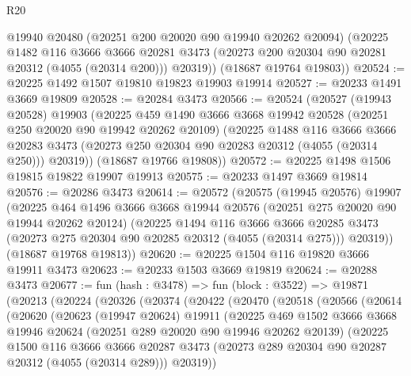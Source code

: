 \begin{lexlean}{R20}
\begin{coremodule}
        @19940
        @20480
        (@20251 @200 @20020 @90 @19940 @20262 @20094)
        (@20225
          @1482
          @116
          @3666
          @3666
          @20281
          @3473
          (@20273 @200 @20304 @90 @20281 @20312 (@4055 (@20314 @200)))
          @20319))
      (@18687 @19764 @19803))
@20524 := @20225 @1492 @1507 @19810 @19823 @19903 @19914
@20527 := @20233 @1491 @3669 @19809
@20528 := @20284 @3473
@20566 := @20524
    (@20527
      (@19943 @20528)
      @19903
      (@20225
        @459
        @1490
        @3666
        @3668
        @19942
        @20528
        (@20251 @250 @20020 @90 @19942 @20262 @20109)
        (@20225
          @1488
          @116
          @3666
          @3666
          @20283
          @3473
          (@20273 @250 @20304 @90 @20283 @20312 (@4055 (@20314 @250)))
          @20319))
      (@18687 @19766 @19808))
@20572 := @20225 @1498 @1506 @19815 @19822 @19907 @19913
@20575 := @20233 @1497 @3669 @19814
@20576 := @20286 @3473
@20614 := @20572
    (@20575
      (@19945 @20576)
      @19907
      (@20225
        @464
        @1496
        @3666
        @3668
        @19944
        @20576
        (@20251 @275 @20020 @90 @19944 @20262 @20124)
        (@20225
          @1494
          @116
          @3666
          @3666
          @20285
          @3473
          (@20273 @275 @20304 @90 @20285 @20312 (@4055 (@20314 @275)))
          @20319))
      (@18687 @19768 @19813))
@20620 := @20225 @1504 @116 @19820 @3666 @19911 @3473
@20623 := @20233 @1503 @3669 @19819
@20624 := @20288 @3473
@20677 := fun (hash : @3478) =>
  fun (block : @3522) =>
  @19871
    (@20213
      (@20224
        (@20326
          (@20374
            (@20422
              (@20470
                (@20518
                  (@20566
                    (@20614
                      (@20620
                        (@20623
                          (@19947 @20624)
                          @19911
                          (@20225
                            @469
                            @1502
                            @3666
                            @3668
                            @19946
                            @20624
                            (@20251 @289 @20020 @90 @19946 @20262 @20139)
                            (@20225
                              @1500
                              @116
                              @3666
                              @3666
                              @20287
                              @3473
                              (@20273 @289 @20304 @90 @20287 @20312 (@4055 (@20314 @289)))
                              @20319))

\end{coremodule}
\end{lexlean}
